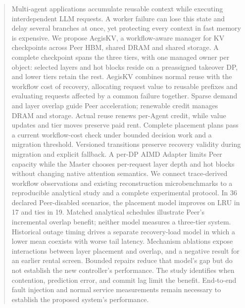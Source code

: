 \begin{abstract}
Multi-agent applications accumulate reusable context while executing
interdependent LLM requests. A worker failure can lose this state and delay
several branches at once, yet protecting every context in fast memory is
expensive. We propose AegisKV, a workflow-aware manager for KV checkpoints
across Peer HBM, shared DRAM and shared storage. A complete checkpoint
spans the three tiers, with one managed owner per object: selected layers
and hot blocks reside on a preassigned takeover DP, and lower tiers
retain the rest. AegisKV combines normal reuse with the workflow cost
of recovery, allocating request value to reusable prefixes and evaluating
requests affected by a common failure together. Sparse demand and layer
overlap guide Peer acceleration; renewable credit manages DRAM and storage.
Actual reuse renews per-Agent credit, while value updates and tier moves
preserve paid rent. Complete placement plans pass a current workflow-cost
check under bounded decision work and a migration threshold.
Versioned transitions preserve recovery validity during migration and
explicit fallback. A per-DP AIMD Adapter limits Peer capacity while the Master
chooses per-request layer depth and hot blocks without changing native
attention semantics. We connect trace-derived
workflow observations and existing reconstruction microbenchmarks to a
reproducible analytical study and a complete experimental protocol.
In 36 declared Peer-disabled scenarios, the placement model improves on
LRU in 17 and ties in 19. Matched analytical schedules illustrate Peer's
incremental overlap benefit; neither model measures a three-tier system. Historical outage timing drives a separate recovery-load model in which
a lower mean coexists with worse tail latency. Mechanism ablations expose
interactions between layer placement and overlap, and a negative result
for an earlier rental screen. Bounded repairs reduce that model's gap
but do not establish the new controller's performance. The study
identifies when contention, prediction error, and commit
lag limit the benefit. End-to-end fault injection and normal
service measurements remain necessary to establish the proposed system's
performance.
\end{abstract}
